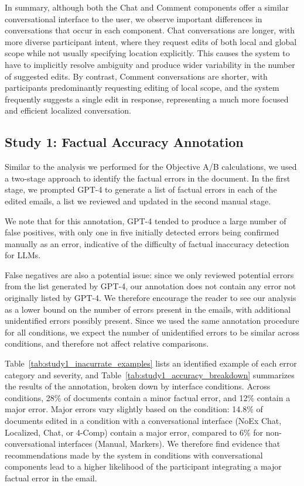 \documentclass[manuscript]{acmart}
\begin{document}
In summary, although both the Chat and Comment components offer a similar conversational interface to the user, we observe important differences in conversations that occur in each component. Chat conversations are longer, with more diverse participant intent, where they request edits of both local and global scope while not usually specifying location explicitly. This causes the system to have to implicitly resolve ambiguity and produce wider variability in the number of suggested edits. By contrast, Comment conversations are shorter, with participants predominantly requesting editing of local scope, and the system frequently suggests a single edit in response, representing a much more focused and efficient localized conversation.

\subsection{Study 1: Factual Accuracy Annotation} \label{app:study1_accuracy}




Similar to the analysis we performed for the Objective A/B calculations, we used a two-stage approach to identify the factual errors in the document. In the first stage, we prompted GPT-4 to generate a list of factual errors in each of the edited emails, a list we reviewed and updated in the second manual stage.

We note that for this annotation, GPT-4 tended to produce a large number of false positives, with only one in five initially detected errors being confirmed manually as an error, indicative of the difficulty of factual inaccuracy detection for LLMs.

False negatives are also a potential issue: since we only reviewed potential errors from the list generated by GPT-4, our annotation does not contain any error not originally listed by GPT-4. We therefore encourage the reader to see our analysis as a lower bound on the number of errors present in the emails, with additional unidentified errors possibly present. Since we used the same annotation procedure for all conditions, we expect the number of unidentified errors to be similar across conditions, and therefore not affect relative comparisons.

Table~\ref{tab:study1_inacurrate_examples} lists an identified example of each error category and severity, and Table~\ref{tab:study1_accuracy_breakdown} summarizes the results of the annotation, broken down by interface conditions. Across conditions, 28\% of documents contain a minor factual error, and 12\% contain a major error. Major errors vary slightly based on the condition: 14.8\% of documents edited in a condition with a conversational interface (NoEx Chat, Localized, Chat, or 4-Comp) contain a major error, compared to 6\% for non-conversational interfaces (Manual, Markers). We therefore find evidence that recommendations made by the system in conditions with conversational components lead to a higher likelihood of the participant integrating a major factual error in the email.
\end{document}
